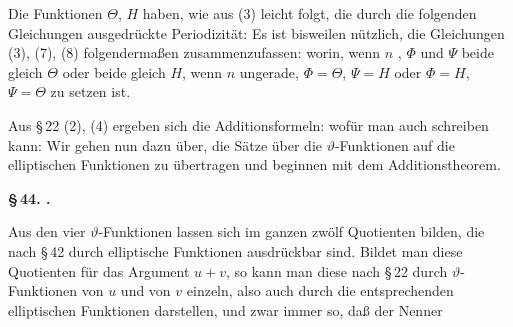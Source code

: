 
Die Funktionen $\Theta$, $H$ haben, wie aus (3) leicht folgt, die
durch die folgenden Gleichungen ausgedrückte Periodizität:
Es ist bisweilen nützlich, die Gleichungen (3), (7), (8)
folgendermaßen zusammenzufassen:
worin, wenn $n$ , $\Phi$ und $\Psi$ beide gleich $\Theta$ oder beide
gleich $H$, wenn $n$ ungerade, $\Phi=\Theta$, $\Psi=H$ oder $\Phi=H$,
$\Psi=\Theta$ zu setzen ist.

Aus \S\,22 (2), (4) ergeben sich die Additionsformeln:
wofür man auch schreiben kann:
Wir gehen nun dazu über, die Sätze über die $\vartheta$-Funktionen
auf die elliptischen Funktionen zu übertragen und beginnen mit
dem Additionstheorem.

\begin{center}
\textbf{\S\,44. .}
\end{center}

Aus den vier $\vartheta$-Funktionen lassen sich im ganzen zwölf
Quotienten bilden, die nach \S\,42 durch elliptische Funktionen
ausdrückbar sind. Bildet man diese Quotienten für das Argument
$u+v$, so kann man diese nach \S\,22 durch $\vartheta$-Funktionen von $u$
und von $v$ einzeln, also auch durch die entsprechenden elliptischen
 Funktionen darstellen, und zwar immer so, daß der Nenner
